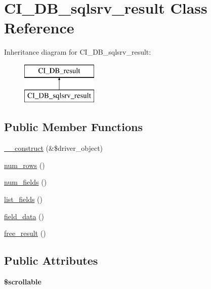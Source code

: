 \hypertarget{class_c_i___d_b__sqlsrv__result}{}\section{C\+I\+\_\+\+D\+B\+\_\+sqlsrv\+\_\+result Class Reference}
\label{class_c_i___d_b__sqlsrv__result}
Inheritance diagram for C\+I\+\_\+\+D\+B\+\_\+sqlsrv\+\_\+result\+:\begin{figure}[H]
\begin{center}
\leavevmode
\includegraphics[height=2.000000cm]{class_c_i___d_b__sqlsrv__result}
\end{center}
\end{figure}
\subsection*{Public Member Functions}
\begin{DoxyCompactItemize}
\item 
\mbox{\hyperlink{class_c_i___d_b__sqlsrv__result_ad7243f8d3224a8c434770b47539817d5}{\+\_\+\+\_\+construct}} (\&\$driver\+\_\+object)
\item 
\mbox{\hyperlink{class_c_i___d_b__sqlsrv__result_a36f1e9f6038aee91dbfd7ad455459083}{num\+\_\+rows}} ()
\item 
\mbox{\hyperlink{class_c_i___d_b__sqlsrv__result_af6ddd0d270b2913598b850cbef49e5d7}{num\+\_\+fields}} ()
\item 
\mbox{\hyperlink{class_c_i___d_b__sqlsrv__result_a9be7d42c62eed09cc8897b09f956d4c3}{list\+\_\+fields}} ()
\item 
\mbox{\hyperlink{class_c_i___d_b__sqlsrv__result_ad6bbd342d7176555a148738481822172}{field\+\_\+data}} ()
\item 
\mbox{\hyperlink{class_c_i___d_b__sqlsrv__result_a0923acb9a50ff40c16f459565c460e66}{free\+\_\+result}} ()
\end{DoxyCompactItemize}
\subsection*{Public Attributes}
\begin{DoxyCompactItemize}
\item 
\mbox{\label{class_c_i___d_b__sqlsrv__result_a2535b1c1dd1449f820c5880daf10a5b5}} 
{\bfseries \$scrollable}
\end{DoxyCompactItemize}

